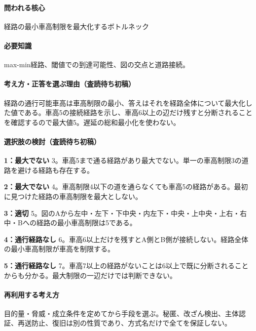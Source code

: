 \paragraph{問われる核心} 経路の最小車高制限を最大化するボトルネック

\paragraph{必要知識} max-min経路、閾値での到達可能性、図の交点と道路接続。

\paragraph{考え方・正答を選ぶ理由（査読待ち初稿）} 経路の通行可能車高は車高制限の最小、答えはそれを経路全体について最大化した値である。車高5の接続経路を示し、車高6以上の辺だけ残すと分断されることを確認するので最大値5。遅延の総和最小化を使わない。

\paragraph{選択肢の検討（査読待ち初稿）}\mbox{}\par

\noindent\textbf{1：最大でない} 3。車高5まで通る経路があり最大でない。単一の車高制限3の道路を避ける経路も存在する。\par

\noindent\textbf{2：最大でない} 4。車高制限4以下の道を通らなくても車高5の経路がある。最初に見つけた経路の車高制限を最大としない。\par

\noindent\textbf{3：適切} 5。図のAから左中・左下・下中央・内左下・中央・上中央・上右・右中・Bへの経路の最小車高制限は5である。\par

\noindent\textbf{4：通行経路なし} 6。車高6以上だけを残すとA側とB側が接続しない。経路全体の最小車高制限が車高を制限する。\par

\noindent\textbf{5：通行経路なし} 7。車高7以上の経路がないことは6以上で既に分断されることからも分かる。最大制限の一辺だけでは判断できない。\par

\paragraph{再利用する考え方} 目的量・脅威・成立条件を定めてから手段を選ぶ。秘匿、改ざん検出、主体認証、再送防止、復旧は別の性質であり、方式名だけで全てを保証しない。

